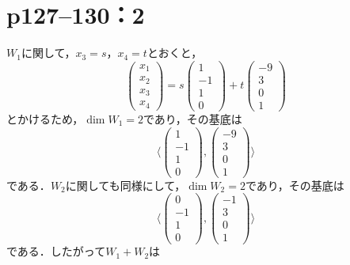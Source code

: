 \documentclass[a4paper,10pt,fleqn]{ltjsarticle}
\begin{document}
\section*{p127--130：2}

\begin{tleftbar}
  $ W_1$に関して，$x_3 =s$，$x_4 =t$とおくと，
  \[
    \begin{pmatrix} x_1 \\ x_2 \\ x_3 \\ x_4 \end{pmatrix} = s \begin{pmatrix} 1 \\ -1 \\ 1 \\ 0 \end{pmatrix} + t \begin{pmatrix} -9 \\ 3 \\ 0 \\ 1 \end{pmatrix}
  \]
  とかけるため，$\dim W_1 = 2$であり，その基底は
  \[
    \langle  \begin{pmatrix} 1 \\ -1 \\ 1 \\ 0 \end{pmatrix} , \begin{pmatrix} -9 \\ 3 \\ 0 \\ 1 \end{pmatrix} \rangle
  \]
  である．$W_2$に関しても同様にして，$\dim W_2 = 2$であり，その基底は
  \[
    \langle \begin{pmatrix} 0 \\ -1 \\ 1 \\ 0 \end{pmatrix} , \begin{pmatrix} -1 \\ 3 \\ 0 \\ 1 \end{pmatrix} \rangle
  \]
  である．したがって$W_1 + W_2$は
  \[
\]
\end{tleftbar}
\end{document}
